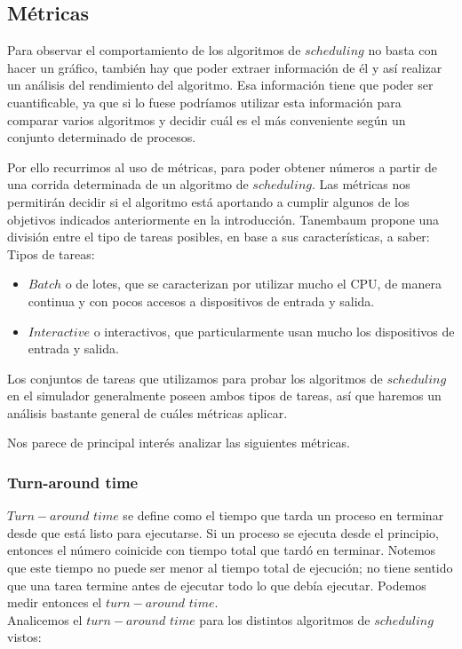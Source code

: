 \subsection{Métricas}

Para observar el comportamiento de los algoritmos de $scheduling$ no basta con hacer un gráfico, también hay que poder extraer información de él y así realizar un análisis del rendimiento del algoritmo. Esa informaci\'on tiene que poder ser cuantificable, ya que si lo fuese podr\'iamos utilizar esta informaci\'on para comparar varios algoritmos y decidir cu\'al es el m\'as conveniente seg\'un un conjunto determinado de procesos. 

Por ello recurrimos al uso de m\'etricas, para poder obtener n\'umeros a partir de una corrida determinada de un algoritmo de $scheduling$. Las m\'etricas nos permitir\'an decidir si el algoritmo est\'a aportando a cumplir algunos de los objetivos indicados anteriormente en la introducci\'on. Tanembaum\cite{Tanen} propone una divisi\'on entre el tipo de tareas posibles, en base a sus caracter\'isticas, a saber:\\

Tipos de tareas:
\begin{itemize}
	\item $Batch$ o de lotes, que se caracterizan por utilizar mucho el CPU, de manera continua y con pocos accesos a dispositivos de entrada y salida.
	\item $Interactive$ o interactivos, que particularmente usan mucho los dispositivos de entrada y salida.  
\end{itemize}

Los conjuntos de tareas que utilizamos para probar los algoritmos de $scheduling$ en el simulador generalmente poseen ambos tipos de tareas, as\'i que haremos un an\'alisis bastante general de cu\'ales m\'etricas aplicar.

Nos parece de principal inter\'es analizar las siguientes m\'etricas.

\subsubsection{Turn-around time}

$Turn-around$ $time$ se define como el tiempo que tarda un proceso en terminar desde que est\'a listo para ejecutarse. Si un proceso se ejecuta desde el principio, entonces el n\'umero coinicide con tiempo total que tard\'o en terminar. Notemos que este tiempo no puede ser menor al tiempo total de ejecuci\'on; no tiene sentido que una tarea termine antes de ejecutar todo lo que deb\'ia ejecutar. Podemos medir entonces el $turn-around$ $time$.\\
Analicemos el $turn-around$ $time$ para los distintos algoritmos de $scheduling$ vistos:


